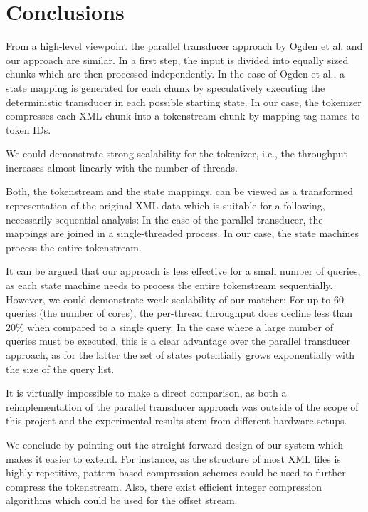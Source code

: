 \section{Conclusions}

From a high-level viewpoint the parallel transducer approach by Ogden et 
al.\cite{Ogden2013} and our approach are similar. In a first step, the input is
divided into equally sized chunks which are then processed independently. In the
case of Ogden et al., a state mapping is generated for each chunk by speculatively
executing the deterministic transducer in each possible starting state. In our case, 
the tokenizer compresses each XML chunk into a tokenstream chunk by mapping 
tag names to token IDs.

We could demonstrate strong scalability for the tokenizer, i.e., the throughput
increases almost linearly with the number of threads.

Both, the tokenstream and the state mappings, can be viewed as a transformed
representation of the original XML data which is suitable for a following,
necessarily sequential analysis: In the case of the parallel transducer, the
mappings are joined in a single-threaded process. In our case, the state
machines process the entire tokenstream.

It can be argued that our approach is less effective for a small number of
queries, as each state machine needs to process the entire tokenstream
sequentially. However, we could demonstrate weak scalability of our matcher:
For up to 60 queries (the number of cores), the per-thread throughput does
decline less than 20\% when compared to a single query. In the case where
a large number of queries must be executed, this is a clear advantage over the
parallel transducer approach, as for the latter the set of states potentially
grows exponentially with the size of the query list.

It is virtually impossible to make a direct comparison, as both a reimplementation 
of the parallel transducer approach was outside of the scope of this project and 
the experimental results stem from different hardware setups.

We conclude by pointing out the straight-forward design of our system which
makes it easier to extend. For instance, as the structure of most XML files is
highly repetitive, pattern based compression schemes could be used to further
compress the tokenstream. Also, there exist efficient integer compression
algorithms which could be used for the offset stream.
